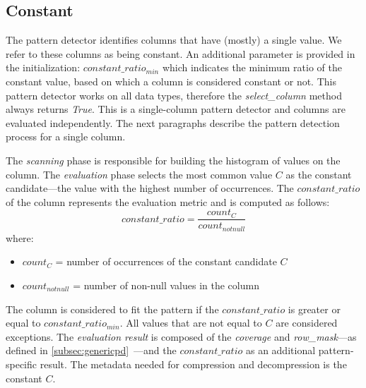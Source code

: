 \subsection{Constant}
\label{subsec:pd:constant}



\graphicspath{{5_automatic_learning/pattern_detection/images/}}

% 

The  pattern detector identifies columns that have (mostly) a single value. We refer to these columns as being constant. An additional parameter is provided in the initialization: \(constant\_ratio_{min}\) which indicates the minimum ratio of the constant value, based on which a column is considered constant or not. This pattern detector works on all data types, therefore the \textit{select\_column} method always returns \textit{True}. This is a single-column pattern detector and columns are evaluated independently. The next paragraphs describe the pattern detection process for a single column.

The \textit{scanning} phase is responsible for building the histogram of values on the column. The \textit{evaluation} phase selects the most common value \(C\) as the constant candidate---the value with the highest number of occurrences. The \(constant\_ratio\) of the column represents the evaluation metric and is computed as follows:
\begin{equation}
\label{eq:pd:constant:constantratio}
    constant\_ratio = \frac{count_{C}}{count_{notnull}}
\end{equation}
where:
\begin{itemize}
    \item[] \(count_{C}\) = number of occurrences of the constant candidate \(C\)
    \item[] \(count_{notnull}\) = number of non-null values in the column
\end{itemize}

The column is considered to fit the  pattern if the \(constant\_ratio\) is greater or equal to \(constant\_ratio_{min}\). All values that are not equal to \(C\) are considered exceptions. The \textit{evaluation result} is composed of the \textit{coverage} and \textit{row\_mask}---as defined in \ref{subsec:genericpd}~---and the \(constant\_ratio\) as an additional pattern-specific result. The metadata needed for compression and decompression is the constant \(C\).

